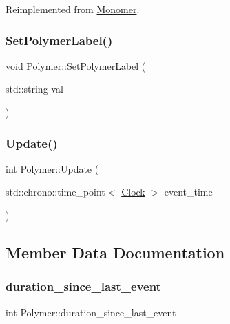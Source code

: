Reimplemented from \mbox{\hyperlink{classMonomer_a6f0dfa4382b3d4fa19b7ee0fb8fe7a55}{Monomer}}.

\mbox{\label{classPolymer_ab96200f701d9e2e63d22bdfd434e5ccb}} 
\subsubsection{\texorpdfstring{Set\+Polymer\+Label()}{SetPolymerLabel()}}
{\footnotesize\ttfamily void Polymer\+::\+Set\+Polymer\+Label (\begin{DoxyParamCaption}\item[{std\+::string}]{val }\end{DoxyParamCaption})\hspace{0.3cm}{\ttfamily [inline]}}

\mbox{\label{classPolymer_ac82f603c3010212122008c4ed3953045}} 
\subsubsection{\texorpdfstring{Update()}{Update()}}
{\footnotesize\ttfamily int Polymer\+::\+Update (\begin{DoxyParamCaption}\item[{std\+::chrono\+::time\+\_\+point$<$ \mbox{\hyperlink{universe_8h_a0ef8d951d1ca5ab3cfaf7ab4c7a6fd80}{Clock}} $>$}]{event\+\_\+time }\end{DoxyParamCaption})}



\subsection{Member Data Documentation}
\mbox{\label{classPolymer_ab78fb6d122f0f8991477ca29d9cf1183}} 
\subsubsection{\texorpdfstring{duration\+\_\+since\+\_\+last\+\_\+event}{duration\_since\_last\_event}}
{\footnotesize\ttfamily int Polymer\+::duration\+\_\+since\+\_\+last\+\_\+event\hspace{0.3cm}{\ttfamily [private]}}

